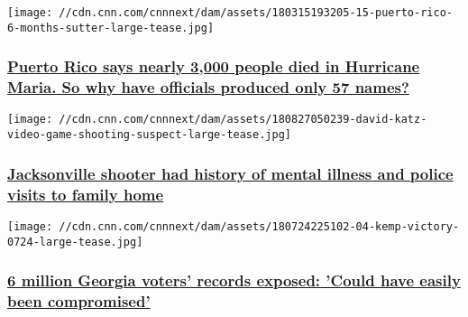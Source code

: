\href{/2018/08/31/health/puerto-rico-deaths-names-update/index.html}{}

\texttt{[image: //cdn.cnn.com/cnnnext/dam/assets/180315193205-15-puerto-rico-6-months-sutter-large-tease.jpg]}

\hypertarget{puerto-rico-says-nearly-3000-people-died-in-hurricane-maria-so-why-have-officials-produced-only-57-names}{%
\subsubsection{\texorpdfstring{\href{/2018/08/31/health/puerto-rico-deaths-names-update/index.html}{Puerto
Rico says nearly 3,000 people died in Hurricane Maria. So why have
officials produced only 57
names?}}{Puerto Rico says nearly 3,000 people died in Hurricane Maria. So why have officials produced only 57 names?}}\label{puerto-rico-says-nearly-3000-people-died-in-hurricane-maria-so-why-have-officials-produced-only-57-names}}

\href{/2018/08/28/us/jacksonville-madden-shooter-katz-mental-health-invs/index.html}{}

\texttt{[image: //cdn.cnn.com/cnnnext/dam/assets/180827050239-david-katz-video-game-shooting-suspect-large-tease.jpg]}

\hypertarget{jacksonville-shooter-had-history-of-mental-illness-and-police-visits-to-family-home}{%
\subsubsection{\texorpdfstring{\href{/2018/08/28/us/jacksonville-madden-shooter-katz-mental-health-invs/index.html}{Jacksonville
shooter had history of mental illness and police visits to family
home}}{Jacksonville shooter had history of mental illness and police visits to family home}}\label{jacksonville-shooter-had-history-of-mental-illness-and-police-visits-to-family-home}}

\href{/2018/08/14/politics/georgia-brian-kemp-voter-data/index.html}{}

\texttt{[image: //cdn.cnn.com/cnnnext/dam/assets/180724225102-04-kemp-victory-0724-large-tease.jpg]}

\hypertarget{6-million-georgia-voters-records-exposed-could-have-easily-been-compromised}{%
\subsubsection{\texorpdfstring{\href{/2018/08/14/politics/georgia-brian-kemp-voter-data/index.html}{6
million Georgia voters' records exposed: 'Could have easily been
compromised'}}{6 million Georgia voters' records exposed: 'Could have easily been compromised'}}\label{6-million-georgia-voters-records-exposed-could-have-easily-been-compromised}}

